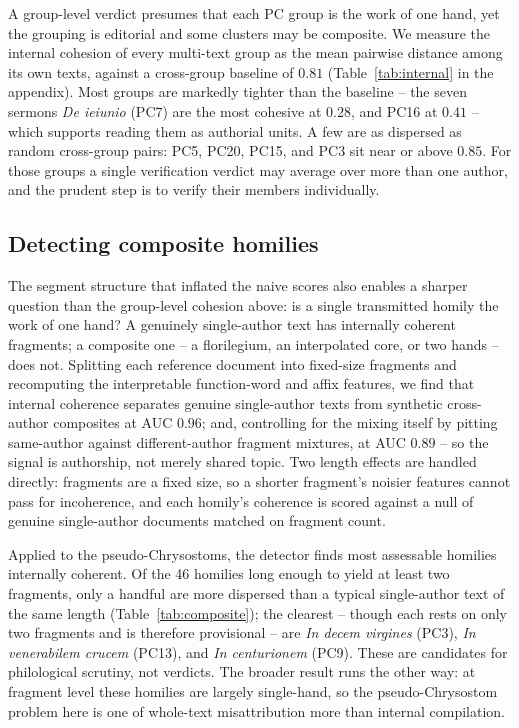 \documentclass{anthology-ch}
\begin{document}
A group-level verdict presumes that each PC group is the work of one hand, yet the grouping is editorial and some clusters may be composite. We measure the internal cohesion of every multi-text group as the mean pairwise distance among its own texts, against a cross-group baseline of $0.81$ (Table~\ref{tab:internal} in the appendix). Most groups are markedly tighter than the baseline -- the seven sermons \emph{De ieiunio} (PC7) are the most cohesive at $0.28$, and PC16 at $0.41$ -- which supports reading them as authorial units. A few are as dispersed as random cross-group pairs: PC5, PC20, PC15, and PC3 sit near or above $0.85$. For those groups a single verification verdict may average over more than one author, and the prudent step is to verify their members individually.

\subsection{Detecting composite homilies}

The segment structure that inflated the naive scores also enables a sharper question than the group-level cohesion above: is a single transmitted homily the work of one hand? A genuinely single-author text has internally coherent fragments; a composite one -- a florilegium, an interpolated core, or two hands -- does not. Splitting each reference document into fixed-size fragments and recomputing the interpretable function-word and affix features, we find that internal coherence separates genuine single-author texts from synthetic cross-author composites at AUC $0.96$; and, controlling for the mixing itself by pitting same-author against different-author fragment mixtures, at AUC $0.89$ -- so the signal is authorship, not merely shared topic. Two length effects are handled directly: fragments are a fixed size, so a shorter fragment's noisier features cannot pass for incoherence, and each homily's coherence is scored against a null of genuine single-author documents matched on fragment count.

Applied to the pseudo-Chrysostoms, the detector finds most assessable homilies internally coherent. Of the 46 homilies long enough to yield at least two fragments, only a handful are more dispersed than a typical single-author text of the same length (Table~\ref{tab:composite}); the clearest -- though each rests on only two fragments and is therefore provisional -- are \emph{In decem virgines} (PC3), \emph{In venerabilem crucem} (PC13), and \emph{In centurionem} (PC9). These are candidates for philological scrutiny, not verdicts. The broader result runs the other way: at fragment level these homilies are largely single-hand, so the pseudo-Chrysostom problem here is one of whole-text misattribution more than internal compilation.
\end{document}
